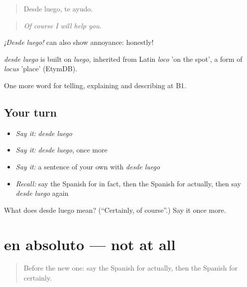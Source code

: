 \begin{quote}
Desde luego, te ayudo.
\end{quote}

\begin{quote}
\emph{Of course I will help you.}
\end{quote}

\emph{¡Desde luego!} can also show annoyance: honestly!

\begin{cousinweb}
\emph{desde luego} is built on \emph{luego}, inherited from Latin \emph{loco} 'on the spot', a form of \emph{locus} 'place' (EtymDB).
\end{cousinweb}

\begin{grammarlens}[title={What you've built}]
One more word for telling, explaining and describing at B1.
\end{grammarlens}

\subsection*{Your turn}
\begin{itemize}
\raggedright
  \item \emph{Say it:} \emph{desde luego}
  \item \emph{Say it:} \emph{desde luego}, once more
  \item \emph{Say it:} a sentence of your own with \emph{desde luego}
  \item \emph{Recall:} say the Spanish for in fact, then the Spanish for actually, then say \emph{desde luego} again
\end{itemize}

\begin{tcolorbox}[breakable,colback=teal!4,colframe=teal!35!black,title={Before you move on}]
What does desde luego mean? (\textquotedblleft{}Certainly, of course\textquotedblright{}.) Say it once more.
\end{tcolorbox}
\section[en absoluto]{en absoluto — not at all}

\label{lesson:ES-C589-en-absoluto}



\begin{quote}
Before the new one: say the Spanish for actually, then the Spanish for certainly.
\end{quote}


